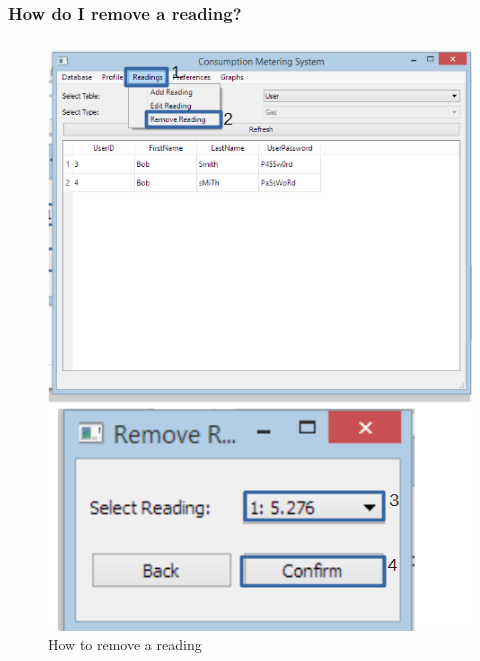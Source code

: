 \subsubsection{How do I remove a reading?}\label{question:remove_reading}
\begin{figure}[H]
	\includegraphics{./manual/images/remove_reading.png}
	\caption{How to remove a reading}
\end{figure}

